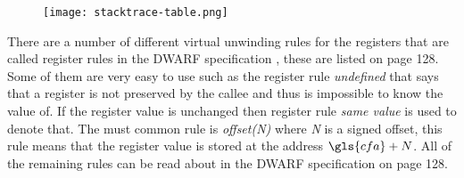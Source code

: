 \begin{figure}[h]
    \centering
    \texttt{[image: stacktrace-table.png]}
    \label{fig:stacktracetable}
\end{figure}


There are a number of different virtual unwinding rules for the registers that are called register rules in the \gls{DWARF} specification \cite{DWARF}, these are listed on page 128.
Some of them are very easy to use such as the register rule \emph{undefined} that says that a register is not preserved by the callee and thus is impossible to know the value of.
If the register value is unchanged then register rule \emph{same value} is used to denote that.
The must common rule is \emph{offset(N)} where \emph{N} is a signed offset, this rule means that the register value is stored at the address $\gls{cfa}+N$.
All of the remaining rules can be read about in the \gls{DWARF} specification \cite{DWARF} on page 128.



